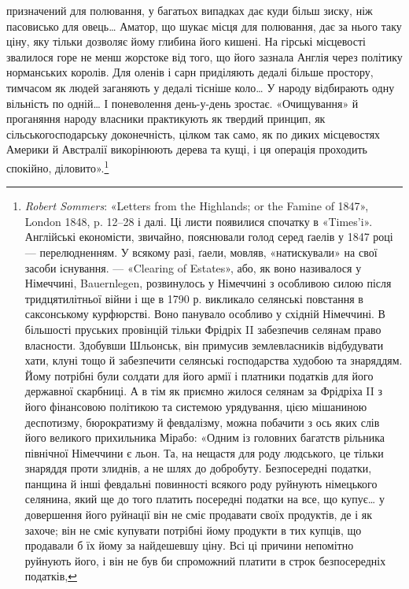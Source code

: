 \parcont{}  %
призначений для полювання, у багатьох випадках дає куди
більш зиску, ніж пасовисько для овець\dots{} Аматор, що шукає
місця для полювання, дає за нього таку ціну, яку тільки дозволяє
йому глибина його кишені. На гірські місцевості звалилося горе
не менш жорстоке від того, що його зазнала Англія через політику
норманських королів. Для оленів і сарн приділяють дедалі
більше простору, тимчасом як людей заганяють у дедалі тісніше
коло\dots{} У народу відбирають одну вільність по одній\dots{} І поневолення
день-у-день зростає. «Очищування» й проганяння
народу власники практикують як твердий принцип, як сільськогосподарську
доконечність, цілком так само, як по диких місцевостях
Америки й Австралії викорінюють дерева та кущі, і ця
операція проходить спокійно, діловито».\footnote{
\emph{Robert Sommers}: «Letters from the Highlands; or the Famine
of 1847», London 1848, p. 12--28 і далі. Ці листи появилися спочатку
в «Times’i». Англійські економісти, звичайно, пояснювали голод серед
ґаелів у 1847 році — перелюдненням. У всякому разі, ґаели, мовляв,
«натискували» на свої засоби існування. — «Clearing of Estates», або,
як воно називалося у Німеччині, Bauernlegen, розвинулось у Німеччині
з особливою силою після тридцятилітньої війни і ще в 1790 р. викликало
селянські повстання в саксонському курфюрстві. Воно панувало особливо
у східній Німеччині. В більшості пруських провінцій тільки Фрідріх II
забезпечив селянам право власности. Здобувши Шльонськ, він примусив
землевласників відбудувати хати, клуні тощо й забезпечити селянські
господарства худобою та знаряддям. Йому потрібні були солдати для
його армії і платники податків для його державної скарбниці. А в тім
як приємно жилося селянам за Фрідріха II з його фінансовою політикою
та системою урядування, цією мішаниною деспотизму, бюрократизму
й февдалізму, можна побачити з ось яких слів його великого прихильника
Мірабо: «Одним із головних багатств рільника північної Німеччини
є льон. Та, на нещастя для роду людського, це тільки знаряддя проти
злиднів, а не шлях до добробуту. Безпосередні податки, панщина й інші
февдальні повинності всякого роду руйнують німецького селянина, який
ще до того платить посередні податки на все, що купує\dots{} у довершення
його руйнації він не сміє продавати своїх продуктів, де і як захоче; він
не сміє купувати потрібні йому продукти в тих купців, що продавали б
їх йому за найдешевшу ціну. Всі ці причини непомітно руйнують його,
і він не був би спроможний платити в строк безпосередніх податків,
}
